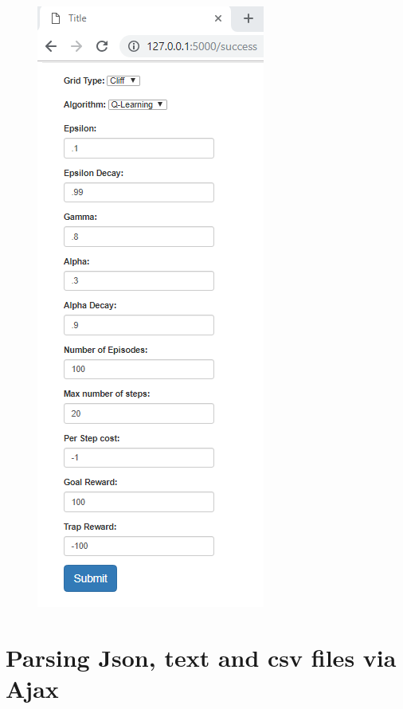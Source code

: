 \begin{enumerate}
\begin{figure}[H]
		\includegraphics[width=0.7\linewidth]{img/successForm}
		\caption{}
		\label{fig:successform}
	\end{figure}
		
\end{enumerate}



\section{Parsing Json, text and csv files via Ajax}

